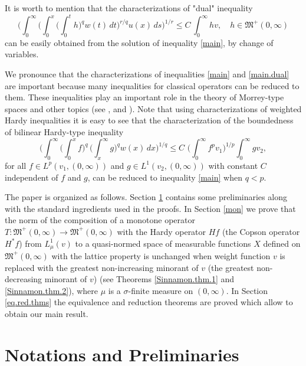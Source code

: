 \documentclass[12pt]{amsart}
\theoremstyle{plain}
\theoremstyle{definition}
\numberwithin{thm}{section}
\numberwithin{equation}{section}
\begin{document}
It is worth to mention that the characterizations of "dual"
inequality
\begin{equation}\label{main.dual}
\bigg( \int_0^{\infty} \bigg( \int_0^x \bigg( \int_0^t h \bigg)^q w(t)\,dt
\bigg)^{r / q} u(x)\,ds \bigg)^{1/r}\leq C \,\int_0^{\infty} h v, \quad h \in {\mathfrak M}^+(0,\infty)
\end{equation}
can be easily obtained  from the solution of inequality
\eqref{main}, by change of variables.

We pronounce that the characterizations of inequalities
\eqref{main} and \eqref{main.dual} are important because many inequalities
for classical operators  can be reduced to them. These inequalities play an important role in the theory of Morrey-type
spaces and other topics (see \cite{BGGM1}, \cite{BGGM2} and \cite{BO}). Note that using characterizations of weighted Hardy inequalities it is easy to see that the characterization of the boundedness of bilinear Hardy-type inequality
\begin{equation}
\bigg( \int_0^{\infty} \bigg( \int_0^x f \bigg)^q \, \bigg( \int_x^{\infty} g \bigg)^q w(x)\,dx \bigg)^{1/q} \le C \,\, \bigg( \int_0^{\infty} f^p v_1 \bigg)^{1/p}  \int_0^{\infty} g v_2,
\end{equation}
for all $f \in L^{p}(v_1,(0,\infty))$ and $g \in L^{1}(v_2,(0,\infty))$ with constant $C$ independent of $f$ and $g$,
can be reduced to inequality \eqref{main} when $q < p$.

The paper is organized as follows. Section \ref{pre} contains some
preliminaries along with the standard ingredients used in the
proofs. In Section \ref{mon} we prove that the norm of the composition of a monotone operator $T: {{\mathfrak M}}^+ (0,\infty){\rightarrow} {{\mathfrak M}}^+ (0,\infty)$ with the Hardy operator $Hf$ (the Copson operator $H^* f$) from $L_{\mu}^1(v)$ to a quasi-normed space of measurable functions $X$ defined on ${{\mathfrak M}}^+ (0,\infty)$ with the lattice property is unchanged when weight function  $v$ is replaced with the greatest non-increasing minorant of $v$ (the greatest non-decreasing minorant of $v$) (see Theorems \ref{Sinnamon.thm.1} and \ref{Sinnamon.thm.2}), where $\mu$ is a ${\sigma}$-finite measure on $(0,\infty)$. In Section \ref{eq.red.thms} the equivalence and reduction theorems are proved which allow to obtain our main result. 

\section{Notations and Preliminaries}\label{pre}
\end{document}
